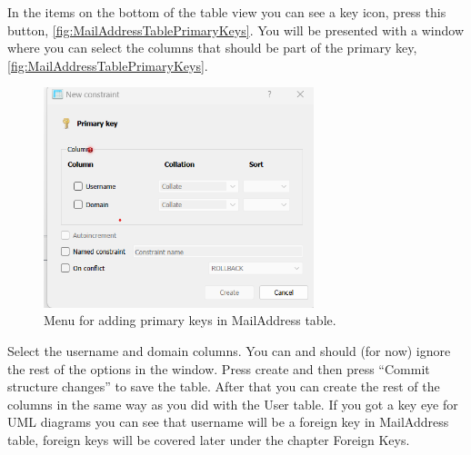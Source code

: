 \documentclass[a4paper,11pt,oneside]{article}
\begin{document}
\begin{sloppypar}
In the items on the bottom of the table view you can see a key icon, press this button, \autoref{fig:MailAddressTablePrimaryKeys}. You will be presented with a window where you can select the columns that should be part of the primary key, \autoref{fig:MailAddressTablePrimaryKeys}. 
\begin{figure}[!htb]
  \centering
  \includegraphics[width=0.7\textwidth]{sqlitestudio/create_mail_address/create_mail_blank_primary_keys.png}
  \caption{Menu for adding primary keys in MailAddress table.}
  \label{fig:MailAddressTablePrimaryKeys}
\end{figure}
Select the username and domain columns. You can and should (for now) ignore the rest of the options in the window. Press create and then press ``Commit structure changes'' to save the table. After that you can create the rest of the columns in the same way as you did with the User table. If you got a key eye for UML diagrams you can see that username will be a foreign key in MailAddress table, foreign keys will be covered later under the chapter Foreign Keys.  

\end{sloppypar}
\end{document}
